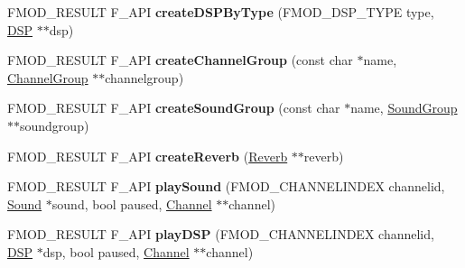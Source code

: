 \begin{DoxyCompactItemize}
\item 
F\+M\+O\+D\+\_\+\+R\+E\+S\+U\+LT F\+\_\+\+A\+PI {\bfseries create\+D\+S\+P\+By\+Type} (F\+M\+O\+D\+\_\+\+D\+S\+P\+\_\+\+T\+Y\+PE type, \hyperlink{class_f_m_o_d_1_1_d_s_p}{D\+SP} $\ast$$\ast$dsp)\hypertarget{class_f_m_o_d_1_1_system_ab3a4c98eb70da7e96866b0f40f5cbd22}{}\label{class_f_m_o_d_1_1_system_ab3a4c98eb70da7e96866b0f40f5cbd22}

\item 
F\+M\+O\+D\+\_\+\+R\+E\+S\+U\+LT F\+\_\+\+A\+PI {\bfseries create\+Channel\+Group} (const char $\ast$name, \hyperlink{class_f_m_o_d_1_1_channel_group}{Channel\+Group} $\ast$$\ast$channelgroup)\hypertarget{class_f_m_o_d_1_1_system_af4d7063579a60c8986eb8bb1f67e7f2c}{}\label{class_f_m_o_d_1_1_system_af4d7063579a60c8986eb8bb1f67e7f2c}

\item 
F\+M\+O\+D\+\_\+\+R\+E\+S\+U\+LT F\+\_\+\+A\+PI {\bfseries create\+Sound\+Group} (const char $\ast$name, \hyperlink{class_f_m_o_d_1_1_sound_group}{Sound\+Group} $\ast$$\ast$soundgroup)\hypertarget{class_f_m_o_d_1_1_system_adac6229aff0ac7480c50988d753df46f}{}\label{class_f_m_o_d_1_1_system_adac6229aff0ac7480c50988d753df46f}

\item 
F\+M\+O\+D\+\_\+\+R\+E\+S\+U\+LT F\+\_\+\+A\+PI {\bfseries create\+Reverb} (\hyperlink{class_f_m_o_d_1_1_reverb}{Reverb} $\ast$$\ast$reverb)\hypertarget{class_f_m_o_d_1_1_system_a4739df49d53fb59dce376f305fa33d9a}{}\label{class_f_m_o_d_1_1_system_a4739df49d53fb59dce376f305fa33d9a}

\item 
F\+M\+O\+D\+\_\+\+R\+E\+S\+U\+LT F\+\_\+\+A\+PI {\bfseries play\+Sound} (F\+M\+O\+D\+\_\+\+C\+H\+A\+N\+N\+E\+L\+I\+N\+D\+EX channelid, \hyperlink{class_f_m_o_d_1_1_sound}{Sound} $\ast$sound, bool paused, \hyperlink{class_f_m_o_d_1_1_channel}{Channel} $\ast$$\ast$channel)\hypertarget{class_f_m_o_d_1_1_system_a9757b01ce190269ccec4cf0a11119277}{}\label{class_f_m_o_d_1_1_system_a9757b01ce190269ccec4cf0a11119277}

\item 
F\+M\+O\+D\+\_\+\+R\+E\+S\+U\+LT F\+\_\+\+A\+PI {\bfseries play\+D\+SP} (F\+M\+O\+D\+\_\+\+C\+H\+A\+N\+N\+E\+L\+I\+N\+D\+EX channelid, \hyperlink{class_f_m_o_d_1_1_d_s_p}{D\+SP} $\ast$dsp, bool paused, \hyperlink{class_f_m_o_d_1_1_channel}{Channel} $\ast$$\ast$channel)\hypertarget{class_f_m_o_d_1_1_system_ac45d8b28b3b594a14f6266ccfa3bf23f}{}\label{class_f_m_o_d_1_1_system_ac45d8b28b3b594a14f6266ccfa3bf23f}


\end{DoxyCompactItemize}
